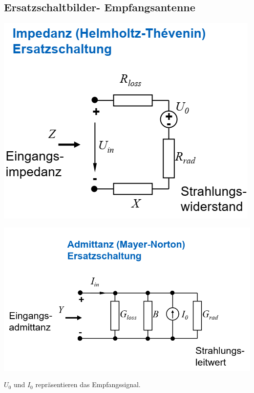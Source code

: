 \documentclass[english]{latex4ei/latex4ei_sheet}
\begin{document}
\begin{sectionbox}
	\subsection{Ersatzschaltbilder- Empfangsantenne}
	\includegraphics[width = \textwidth]{./img/antenne_empfang_ersatz.png}
\end{sectionbox}	
\begin{sectionbox}
	
	\includegraphics[width = \textwidth]{./img/antenne_empfang_ersatz_02.png}
	
	
$U_0$ und $I_0$ repräsentieren das Empfangssignal.
\end{sectionbox}
\end{document}
